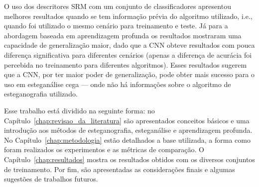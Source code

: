O uso dos descritores SRM com um conjunto de classificadores apresentou melhores resultados quando se tem informação prévia do algoritmo utilizado, i.e., quando foi utilizado o mesmo cenário para treinamento e teste. Já para a abordagem baseada em aprendizagem profunda os resultados mostraram uma capacidade de generalização maior, dado que a CNN obteve resultados com pouca diferença significativa para diferentes cenários (apenas a diferença de acurácia foi percebida no treinamento para diferentes algoritmos). Esses resultados sugerem que a CNN, por ter maior poder de generalização, pode obter mais sucesso para o uso em esteganálise cega --- onde não há informações sobre o algoritmo de esteganografia utilizado.

Esse trabalho está dividido na seguinte forma: no Capítulo~\ref{chap:revisao_da_literatura} são apresentados conceitos básicos e uma introdução aos métodos de esteganografia, esteganálise e aprendizagem profunda. No Capítulo~\ref{chap:metodologia} estão detalhados a base utilizada, a forma como foram realizados os experimentos e as métricas de comparação. O Capítulo~\ref{chap:resultados} mostra os resultados obtidos com os diversos conjuntos de treinamento. Por fim, são apresentadas as considerações finais e algumas sugestões de trabalhos futuros.






